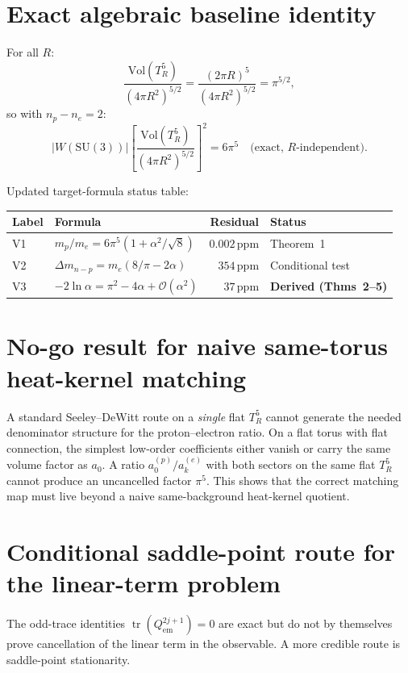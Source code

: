 \documentclass[11pt,a4paper]{article}
\begin{document}
\section{Exact algebraic baseline identity}
For all $R$:
\[
  \frac{\mathrm{Vol}(T^5_R)}{(4\pi R^2)^{5/2}}
  = \frac{(2\pi R)^5}{(4\pi R^2)^{5/2}} = \pi^{5/2},
\]
so with $n_p-n_e=2$:
\[
  |W(\mathrm{SU}(3))|\left[\frac{\mathrm{Vol}(T^5_R)}{(4\pi R^2)^{5/2}}\right]^2
  = 6\pi^5 \quad \text{(exact, }R\text{-independent)}.
\]

Updated target-formula status table:
\begin{center}
\renewcommand{\arraystretch}{1.15}
\begin{tabular}{llrl}
\toprule
Label & Formula & Residual & Status\\
\midrule
V1 & $m_p/m_e=6\pi^5(1+\alpha^2/\sqrt{8})$ & $0.002\,\mathrm{ppm}$ & Theorem~1\\
V2 & $\Delta m_{n-p}=m_e(8/\pi-2\alpha)$ & $354\,\mathrm{ppm}$ & Conditional test\\
V3 & $-2\ln\alpha=\pi^2-4\alpha+\mathcal{O}(\alpha^2)$ & $37\,\mathrm{ppm}$ & \textbf{Derived (Thms~2--5)}\\
\bottomrule
\end{tabular}
\end{center}

\section{No-go result for naive same-torus heat-kernel matching}
A standard Seeley--DeWitt route on a \emph{single} flat $T^5_R$ cannot generate
the needed denominator structure for the proton--electron ratio.  On a flat torus
with flat connection, the simplest low-order coefficients either vanish or carry
the same volume factor as $a_0$.  A ratio $a_0^{(p)}/a_k^{(e)}$ with both sectors
on the same flat $T^5_R$ cannot produce an uncancelled factor $\pi^5$.  This shows
that the correct matching map must live beyond a naive same-background heat-kernel
quotient.

\section{Conditional saddle-point route for the linear-term problem}
The odd-trace identities $\operatorname{tr}(Q_{\mathrm{em}}^{2j+1})=0$ are exact
but do not by themselves prove cancellation of the linear term in the observable.
A more credible route is saddle-point stationarity.
\end{document}
